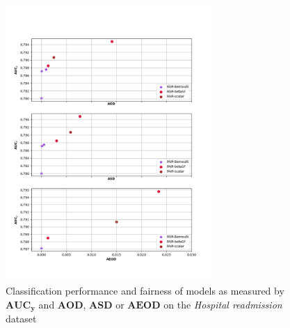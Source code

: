 \documentclass[preprint,12pt]{elsarticle}
\begin{document}
\begin{figure}
	\center
	\includegraphics[angle=0, width=0.7\textwidth]{Readmission.png}
	\captionsetup{justification=centering}
	\caption{Classification performance and fairness of models as measured by $\mathbf{AUC_y}$ and $\mathbf{AOD}$, $\mathbf{ASD}$ or $\mathbf{AEOD}$ on the \textit{Hospital readmission} dataset}
	\label{fig:Readmission}
	\vskip -0.2in
\end{figure}
\end{document}
